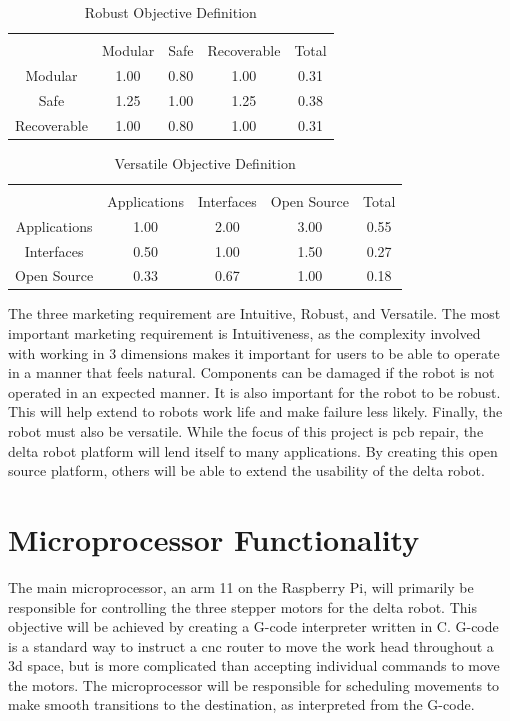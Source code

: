 \documentclass[11pt]{report}
\begin{document}
\begin{table}[ht] 
	\caption{Robust Objective Definition}
	\label{table:robust}
	\centering 
	\begin{tabular}{c c c c c} 
		\hline\hline \\
		 			& Modular 	& Safe 		& Recoverable	& Total\\ 
		Modular	 	& 1.00 		& 0.80		& 1.00 		& 0.31 \\ 
		Safe 		& 1.25		& 1.00 		& 1.25		& 0.38 \\ 
		Recoverable 	& 1.00 		& 0.80 		& 1.00 		& 0.31 \\ 
	\end{tabular} 
\end{table}

\begin{table}[ht] 
	\caption{Versatile Objective Definition}
	\label{table:versatile}
	\centering 
	\begin{tabular}{c c c c c} 
		\hline\hline \\
		 			& Applications& Interfaces	& Open Source	& Total\\ 
		Applications	& 1.00 		& 2.00		& 3.00 		& 0.55 \\ 
		Interfaces	& 0.50		& 1.00 		& 1.50		& 0.27 \\ 
		Open Source 	& 0.33 		& 0.67 		& 1.00 		& 0.18 \\ 
	\end{tabular} 
\end{table}

The three marketing requirement are Intuitive, Robust, and Versatile.
The most important marketing requirement is Intuitiveness, as the complexity involved with working in 3 dimensions makes it important for users to be able to operate in a manner that feels natural.
Components can be damaged if the robot is not operated in an expected manner.
It is also important for the robot to be robust.
This will help extend to robots work life and make failure less likely.
Finally, the robot must also be versatile.
While the focus of this project is \gls{pcb} repair, the delta robot platform will lend itself to many applications.
By creating this open source platform, others will be able to extend the usability of the delta robot.

\section{Microprocessor Functionality}
The main microprocessor, an \gls{arm} 11 on the Raspberry Pi, will primarily be responsible for controlling the three stepper motors for the delta robot.
This objective will be achieved by creating a G-code interpreter written in C.
G-code is a standard way to instruct a \gls{cnc} router to move the work head throughout a \gls{3d} space, but is more complicated than accepting individual commands to move the motors.
The microprocessor will be responsible for scheduling movements to make smooth transitions to the destination, as interpreted from the G-code.
\end{document}
